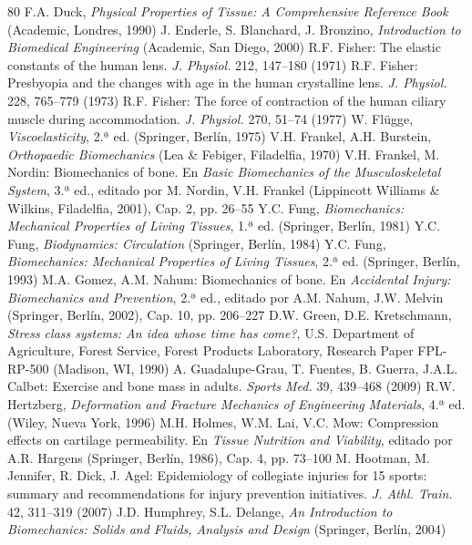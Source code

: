 \documentclass[12pt]{book}
\begin{document}
\begin{thebibliography}{80}
   F.A. Duck, \textit{Physical Properties of Tissue: A Comprehensive Reference Book} (Academic, Londres, 1990)
   J. Enderle, S. Blanchard, J. Bronzino, \textit{Introduction to Biomedical Engineering} (Academic, San Diego, 2000)
   R.F. Fisher: The elastic constants of the human lens. \textit{J. Physiol.} 212, 147--180 (1971)
   R.F. Fisher: Presbyopia and the changes with age in the human crystalline lens. \textit{J. Physiol.} 228, 765--779 (1973)
   R.F. Fisher: The force of contraction of the human ciliary muscle during accommodation. \textit{J. Physiol.} 270, 51--74 (1977)
   W. Flügge, \textit{Viscoelasticity}, 2.ª ed. (Springer, Berlín, 1975)
   V.H. Frankel, A.H. Burstein, \textit{Orthopaedic Biomechanics} (Lea \& Febiger, Filadelfia, 1970)
   V.H. Frankel, M. Nordin: Biomechanics of bone. En \textit{Basic Biomechanics of the Musculoskeletal System}, 3.ª ed., editado por M. Nordin, V.H. Frankel (Lippincott Williams \& Wilkins, Filadelfia, 2001), Cap. 2, pp. 26--55
   Y.C. Fung, \textit{Biomechanics: Mechanical Properties of Living Tissues}, 1.ª ed. (Springer, Berlín, 1981)
   Y.C. Fung, \textit{Biodynamics: Circulation} (Springer, Berlín, 1984)
   Y.C. Fung, \textit{Biomechanics: Mechanical Properties of Living Tissues}, 2.ª ed. (Springer, Berlín, 1993)
   M.A. Gomez, A.M. Nahum: Biomechanics of bone. En \textit{Accidental Injury: Biomechanics and Prevention}, 2.ª ed., editado por A.M. Nahum, J.W. Melvin (Springer, Berlín, 2002), Cap. 10, pp. 206--227
   D.W. Green, D.E. Kretschmann, \textit{Stress class systems: An idea whose time has come?}, U.S. Department of Agriculture, Forest Service, Forest Products Laboratory, Research Paper FPL-RP-500 (Madison, WI, 1990)
   A. Guadalupe-Grau, T. Fuentes, B. Guerra, J.A.L. Calbet: Exercise and bone mass in adults. \textit{Sports Med.} 39, 439--468 (2009)
   R.W. Hertzberg, \textit{Deformation and Fracture Mechanics of Engineering Materials}, 4.ª ed. (Wiley, Nueva York, 1996)
   M.H. Holmes, W.M. Lai, V.C. Mow: Compression effects on cartilage permeability. En \textit{Tissue Nutrition and Viability}, editado por A.R. Hargens (Springer, Berlín, 1986), Cap. 4, pp. 73--100
   M. Hootman, M. Jennifer, R. Dick, J. Agel: Epidemiology of collegiate injuries for 15 sports: summary and recommendations for injury prevention initiatives. \textit{J. Athl. Train.} 42, 311--319 (2007)
   J.D. Humphrey, S.L. Delange, \textit{An Introduction to Biomechanics: Solids and Fluids, Analysis and Design} (Springer, Berlín, 2004)

\end{thebibliography}
\end{document}
